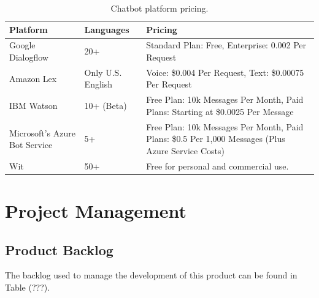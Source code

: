 \documentclass[titlepage, 12pt]{article}
\begin{document}
\begin{center}
\begin{table}[h]
\centering
    \begin{tabular}{ L{2cm} L{3cm} L{4.5cm} }
    
        \toprule
        \textbf{Platform} & \textbf{Languages} & \textbf{Pricing} \\

        \midrule
        Google Dialogflow & 20+ & Standard Plan: Free, Enterprise: 0.002 Per Request \\

        \midrule 
        Amazon Lex & Only U.S. English & Voice: \$0.004 Per Request, Text: \$0.00075 Per Request \\

        \midrule
        IBM Watson & 10+ (Beta) & Free Plan: 10k Messages Per Month, Paid Plans: Starting at \$0.0025 Per Message \\

        \midrule
        Microsoft’s Azure Bot Service & 5+ & Free Plan: 10k Messages Per Month, Paid Plans: \$0.5 Per 1,000 Messages (Plus Azure Service Costs) \\

        \midrule
        Wit & 50+ & Free for personal and commercial use. \\

        \bottomrule
        
    \end{tabular}
    \caption{Chatbot platform pricing.}
\end{table}
\end{center}

\pagebreak
\section{Project Management}

\subsection{Product Backlog}

The backlog used to manage the development of this product can be found in Table (???).
\end{document}

